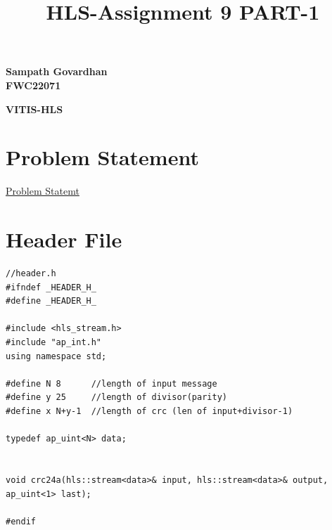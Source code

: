 \documentclass{article}
\title{
HLS-Assignment 9 PART-1
}
\begin{document}
\maketitle
\hfill \textbf{Sampath Govardhan} \\
\null \hfill \textbf{FWC22071}\\
\maketitle
\hfill \textbf{VITIS-HLS}
\section{Problem Statement}
\href{run:./problem_statement.pdf} {Problem Statemt}
\vspace{1cm}
\section{Header File}
\begin{lstlisting}
//header.h
#ifndef _HEADER_H_
#define _HEADER_H_

#include <hls_stream.h>
#include "ap_int.h"
using namespace std;

#define N 8      //length of input message
#define y 25     //length of divisor(parity)
#define x N+y-1  //length of crc (len of input+divisor-1)

typedef ap_uint<N> data;


void crc24a(hls::stream<data>& input, hls::stream<data>& output, ap_uint<1> last);

#endif



\end{lstlisting}

\vspace{15cm}
\end{document}
